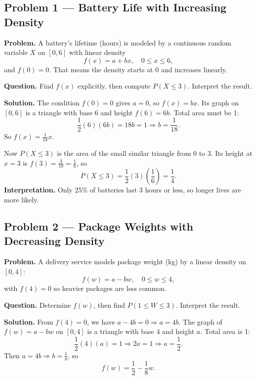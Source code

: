	\begin{ExamProblems}
		
		\hypertarget{c3-ex1}{}
		\item
		\subsection*{Problem 1 — Battery Life with Increasing Density}
		
		\textbf{Problem.}
		A battery's lifetime (hours) is modeled by a continuous random variable \(X\) on \([0, 6]\) with
		linear density
		\[
		f(x)=a+bx,\quad 0\le x\le 6,
		\]
		and \(f(0)=0\). That means the density starts at 0 and increases linearly.
		
		\textbf{Question.} Find \(f(x)\) explicitly, then compute \(P(X\le 3)\). Interpret the result.
		
		\textbf{Solution.}
		The condition \(f(0)=0\) gives \(a=0\), so \(f(x)=bx\).
		Its graph on \([0,6]\) is a triangle with base 6 and height \(f(6)=6b\).
		Total area must be 1:
		\[
		\frac{1}{2}(6)(6b)=18b=1\Rightarrow b=\frac{1}{18}.
		\]
		So \(f(x)=\frac{1}{18}x\).
		
		Now \(P(X\le 3)\) is the area of the small similar triangle from 0 to 3.
		Its height at \(x=3\) is \(f(3)=\frac{3}{18}=\frac{1}{6}\), so
		\[
		P(X\le 3)=\frac{1}{2}(3)\left(\frac{1}{6}\right)=\frac{1}{4}.
		\]
		\textbf{Interpretation.} Only 25\% of batteries last 3 hours or less, so longer lives are more likely.
		
		
		\hypertarget{c3-ex2}{}
		\item
		\subsection*{Problem 2 — Package Weights with Decreasing Density}
		
		\textbf{Problem.}
		A delivery service models package weight (kg) by a linear density on \([0, 4]\):
		\[
		f(w)=a-bw,\quad 0\le w\le 4,
		\]
		with \(f(4)=0\) so heavier packages are less common.
		
		\textbf{Question.} Determine \(f(w)\), then find \(P(1\le W\le 3)\). Interpret the result.
		
		\textbf{Solution.}
		From \(f(4)=0\), we have \(a-4b=0\Rightarrow a=4b\).
		The graph of \(f(w)=a-bw\) on \([0,4]\) is a triangle with base 4 and height \(a\).
		Total area is 1:
		\[
		\frac{1}{2}(4)(a)=1\Rightarrow 2a=1\Rightarrow a=\frac{1}{2}.
		\]
		Then \(a=4b\Rightarrow b=\frac{1}{8}\), so
		\[
		f(w)=\frac{1}{2}-\frac{1}{8}w.
		\]
		

\end{ExamProblems}

